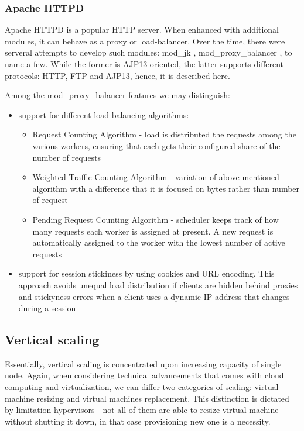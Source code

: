 \subsubsection*{Apache HTTPD}
Apache HTTPD \cite{ApacheHTTPD} is a popular HTTP server. When enhanced with additional modules, it can behave as a proxy or load-balancer. Over the time, there were serveral attempts to develop such modules: mod\_jk \cite{ApacheModJk}, mod\_proxy\_balancer \cite{ApacheModProxyBalancer}, to name a few. While the former is AJP13 oriented, the latter supports different protocols: HTTP, FTP and AJP13, hence, it is described here.

Among the mod\_proxy\_balancer features we may distinguish:
\begin{itemize}
 \item support for different load-balancing algorithms:
    \begin{itemize}
      \item Request Counting Algorithm - load is distributed the requests among the various workers, ensuring that each gets their configured share of the number of requests
      \item Weighted Traffic Counting Algorithm - variation of above-mentioned algorithm with a difference that it is focused on bytes rather than number of request
      \item Pending Request Counting Algorithm - scheduler keeps track of how many requests each worker is assigned at present. A new request is automatically assigned to the worker with the lowest number of active requests
    \end{itemize}

 \item support for session stickiness by using cookies and URL encoding. This approach \cite{ApacheModProxyBalancer} avoids unequal load distribution if clients are hidden behind proxies and stickyness errors when a client uses a dynamic IP address that changes during a session
\end{itemize}

\subsection{Vertical scaling}
Essentially, vertical scaling is concentrated upon increasing capacity of single node. Again, when considering technical advancements that comes with cloud computing and virtualization, we can differ two categories of scaling: virtual machine resizing and virtual machines replacement. This distinction is dictated by limitation hypervisors - not all of them are able to resize virtual machine without shutting it down, in that case provisioning new one is a necessity.

